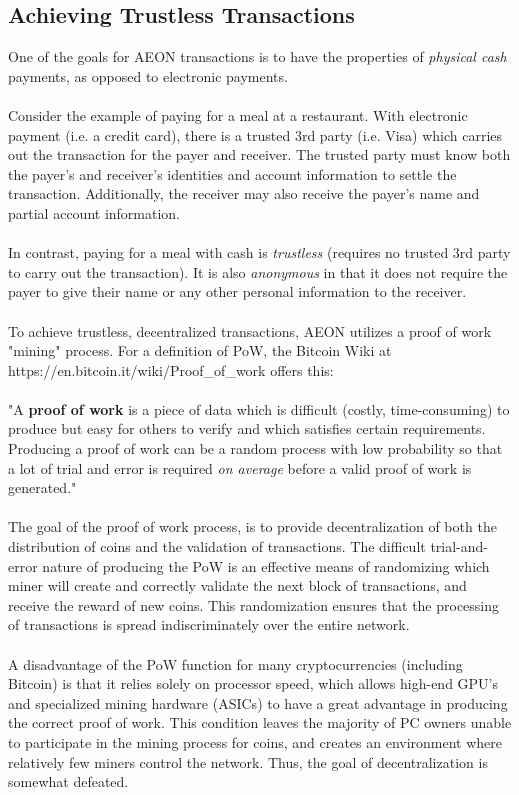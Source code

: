 \subsection{Achieving Trustless Transactions}
\label{secPoW} 
One of the goals for AEON transactions is to have the properties of \textit{physical cash} payments, as opposed to electronic payments.\\
\\
Consider the example of paying for a meal at a restaurant. With electronic payment (i.e. a credit card), there is a trusted 3rd party (i.e. Visa) which carries out the transaction for the payer and receiver. The trusted party must know both the payer's and receiver's identities and account information to settle the transaction. Additionally, the receiver may also receive the payer's name and partial account information.\\
\\
In contrast, paying for a meal with cash is \textit{trustless} (requires no trusted 3rd party to carry out the transaction). It is also \textit{anonymous} in that it does not require the payer to give their name or any other personal information to the receiver.\\
\\
To achieve trustless, decentralized transactions, AEON utilizes a proof of work "mining" process.  For a definition of PoW, the Bitcoin Wiki at https://en.bitcoin.it/wiki/Proof\_of\_work offers this:\\
\\
"A \textbf{proof of work} is a piece of data which is difficult (costly, time-consuming) to produce but easy for others to verify and which satisfies certain requirements. Producing a proof of work can be a random process with low probability so that a lot of trial and error is required \textit{on average} before a valid proof of work is generated."\\
\\
The goal of the proof of work process, is to provide decentralization of both the distribution of coins and the validation of transactions. The difficult trial-and-error nature of producing the PoW is an effective means of randomizing which miner will create and correctly validate the next block of transactions, and receive the reward of new coins. This randomization ensures that the processing of transactions is spread indiscriminately over the entire network.\\
\\
A disadvantage of the PoW function for many cryptocurrencies (including Bitcoin) is that it relies solely on processor speed, which allows high-end GPU's and specialized mining hardware (ASICs) to have a great advantage in producing the correct proof of work. This condition leaves the majority of PC owners unable to participate in the mining process for coins, and creates an environment where relatively few miners control the network.  Thus, the goal of decentralization is somewhat defeated.\\

